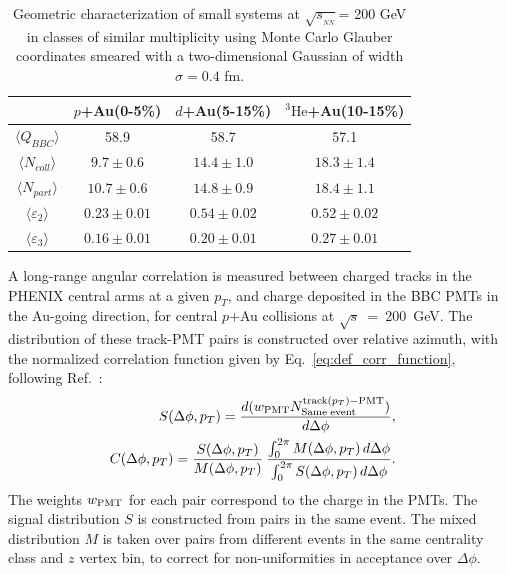\documentclass[%
reprint,
showpacs,preprintnumbers,
 amsmath,amssymb,
 aps,
]{revtex4-1}
\newcommand{\pt}{\mbox{$p_T$}\xspace}
\newcommand{\sqs}{\mbox{$\sqrt{s}$}\xspace}
\newcommand{\sqsn}{\mbox{$\sqrt{s_{_{NN}}}$}\xspace}
\newcommand{\dau}{\mbox{$d$+Au}\xspace}
\newcommand{\pau}{\mbox{$p$+Au}\xspace}
\newcommand{\hau}{\mbox{$^3\text{He}$+Au}\xspace}
\begin{document}
\begin{table}
\caption{Geometric characterization of small systems at \sqsn = 200 GeV in classes of similar multiplicity using Monte Carlo Glauber coordinates smeared with a two-dimensional Gaussian of width $\sigma=0.4$ fm.}
\begin{ruledtabular}
\begin{tabular}{c c c c}
\label{table_geometry}
 & \pau (0-5\%) & \dau (5-15\%) & \hau (10-15\%) \\
\hline
 $\langle Q_{BBC} \rangle$ & 58.9 & 58.7 & 57.1 \\
 $\langle N_{coll} \rangle$ & $9.7\pm 0.6$ & $14.4\pm 1.0$ & $18.3\pm 1.4$ \\
 $\langle N_{part} \rangle$ & $10.7\pm 0.6$ & $14.8\pm 0.9$ & $18.4\pm  1.1$ \\ 
 $\langle \varepsilon_2 \rangle$ & $0.23\pm 0.01$ & $0.54\pm 0.02$ & $0.52\pm 0.02$ \\
 $\langle \varepsilon_3 \rangle$ & $0.16\pm 0.01$ & $0.20\pm 0.01$ & $0.27\pm 0.01$
\end{tabular}
\end{ruledtabular}
\end{table}
A long-range angular correlation is measured between charged tracks in the PHENIX central arms at a given \pt, and charge deposited in the BBC PMTs in the Au-going direction, for central \pau collisions at \sqs~=~200~GeV. The distribution of these track-PMT pairs is constructed over relative azimuth, with the normalized correlation function given by Eq.~\ref{eq:def_corr_function}, following Ref.~\cite{PhysRevLett.115.142301}:
\begin{eqnarray}
  S(\Delta\phi,p_{T})=
  \frac{ d(w_{{\rm PMT}} N^{{\rm track}(p_{T}){\rm - PMT}}_{{\rm Same \; event}}) }{ d\Delta\phi}, & &
\label{eq31} \\
  C(\Delta\phi,p_{T}) =
          \frac{S(\Delta\phi,p_{T})}{M(\Delta\phi,p_{T})} \:
          \frac{\int_{0}^{2\pi} M(\Delta\phi,p_{T}) \, d\Delta\phi}{\int_{0}^{2\pi} S(\Delta\phi,p_{T}) \, d\Delta\phi}. & &
  \label{eq:def_corr_function}
\end{eqnarray}
The weights $w_{{\rm PMT}}$ for each pair correspond to the charge in the PMTs. The signal distribution $S$ is constructed from pairs in the same event. The mixed distribution $M$ is taken over pairs from different events in the same centrality class and $z$ vertex bin, to correct for non-uniformities in acceptance over $\Delta \phi$.
\end{document}
